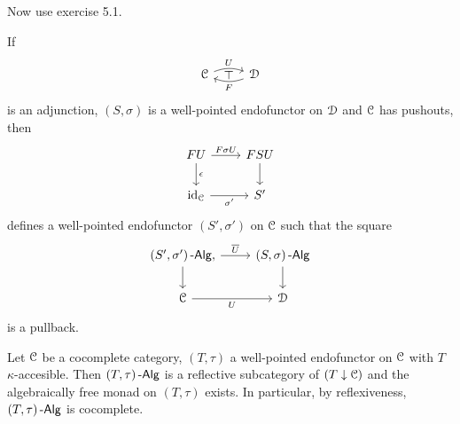 \documentclass[a4paper,11pt,oneside,openany]{scrbook}
\begin{document}
Now use exercise 5.1.
\begin{prop}
    If
    \begin{displaymath}
        \begin{tikzcd}
	\C \arrow[r, "U", bend left=20]
	    \arrow[from=r, "F", bend left=20]
	    \arrow[r, phantom, "\top"]
	    & \D
        \end{tikzcd}
    \end{displaymath}
    is an adjunction, $ (S,\sigma) $ is a well-pointed endofunctor on $ \operatorname{\mathcal{D}} $
    and $ \operatorname{\mathcal{C}} $ has pushouts, then
    \begin{displaymath}
        \begin{tikzcd}
	    FU \arrow[r,"F\sigma U"]\arrow[d, "\epsilon"]& FSU \arrow[d]\\
	    \id_{\C} \arrow[r, "\sigma'"']& S'
        \end{tikzcd}
    \end{displaymath}
    defines a well-pointed endofunctor $ (S',\sigma') $ on $ \operatorname{\mathcal{C}} $ such that the square
    \begin{displaymath}
        \begin{tikzcd}
	    (S',\sigma')\Alg \arrow[r, "\overline U"],\arrow[d]
	    & (S,\sigma)\Alg \arrow[d]\\
	    \C \arrow[r, "U"'] & \D
        \end{tikzcd}
    \end{displaymath}
    is a pullback.\hfill\qedsymbol
\end{prop}
\begin{thm}
    Let $ \operatorname{\mathcal{C}} $ be a cocomplete category, $ (T,\tau) $ a well-pointed endofunctor on $ \operatorname{\mathcal{C}} $ with $ T $ $ \kappa $-accesible.
    Then $ (T,\tau)\operatorname{-\mathsf{Alg}} $ is a reflective subcategory of $ (T\downarrow\operatorname{\mathcal{C}})$ and the algebraically free monad on $ (T,\tau) $ exists. In particular, by reflexiveness, $ (T,\tau)\operatorname{-\mathsf{Alg}} $ is cocomplete.
\end{thm}
\end{document}
